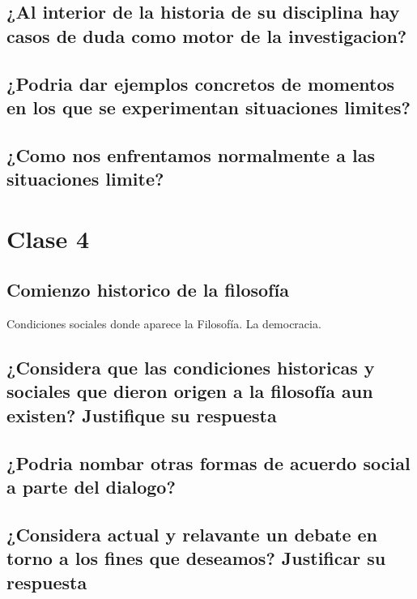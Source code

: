 \documentclass[11pt]{book}
\begin{document}
    \section{¿Al interior de la historia de su disciplina hay casos de duda como motor de la investigacion?}
    \section{¿Podria dar ejemplos concretos de momentos en los que se experimentan situaciones limites?}
    \section{¿Como nos enfrentamos normalmente a las situaciones limite?}

    \chapter{Clase 4}
    \section{Comienzo historico de la filosofía}
    Condiciones sociales donde aparece la Filosofía. La democracia.
    \section{¿Considera que las condiciones historicas y sociales que dieron origen a la filosofía aun existen? Justifique su respuesta}
    \section{¿Podria nombar otras formas de acuerdo social a parte del dialogo?}
    \section{¿Considera actual y relavante un debate en torno a los fines que deseamos? Justificar su respuesta}
\end{document}
